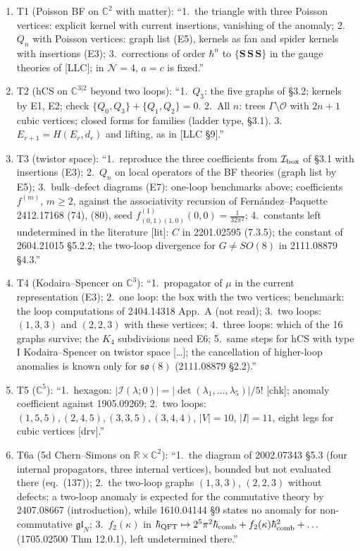 \documentclass[10pt,a4paper]{article}
\numberwithin{equation}{section}
\begin{document}
\begin{enumerate}\itemsep1pt
\item T1 (Poisson BF on $\mathbb C^2$ with matter): ``1.\ the triangle with three Poisson vertices: explicit kernel with current insertions, vanishing of the anomaly; 2.\ $Q_n$ with Poisson vertices: graph list (E5), kernels as fan and spider kernels with insertions (E3); 3.\ corrections of order $\hbar^n$ to $\{\mathbf S\,\mathbf S\,\mathbf S\}$ in the gauge theories of [LLC]; in $\mathcal N=4$, $a=c$ is fixed.''
\item T2 (hCS on $\mathbb C^{3|2}$ beyond two loops): ``1.\ $Q_3$: the five graphs of \S3.2; kernels by E1, E2; check $\{Q_0,Q_3\}+\{Q_1,Q_2\}=0$. 2.\ All $n$: trees $\Gamma\setminus\mathcal O$ with $2n+1$ cubic vertices; closed forms for families (ladder type, \S3.1). 3.\ $E_{r+1}=H(E_r,d_r)$ and lifting, as in [LLC \S9].''
\item T3 (twistor space): ``1.\ reproduce the three coefficients from $\mathcal I_{\rm box}$ of \S3.1 with insertions (E3); 2.\ $Q_n$ on local operators of the BF theories (graph list by E5); 3.\ bulk--defect diagrams (E7): one-loop benchmarks above; coefficients $f^{(m)}$, $m\ge2$, against the associativity recursion of Fern\'andez--Paquette 2412.17168 (74), (80), seed $f^{(1)}_{(0,1)(1,0)}(0,0)=\frac1{32\pi^2}$; 4.\ constants left undetermined in the literature [lit]: $C$ in 2201.02595 (7.3.5); the constant of 2604.21015 \S5.2.2; the two-loop divergence for $G\ne SO(8)$ in 2111.08879 \S4.3.''
\item T4 (Kodaira--Spencer on $\mathbb C^3$): ``1.\ propagator of $\mu$ in the current representation (E3); 2.\ one loop: the box with the two vertices; benchmark: the loop computations of 2404.14318 App.~A (not read); 3.\ two loops: $(1,3,3)$ and $(2,2,3)$ with these vertices; 4.\ three loops: which of the 16 graphs survive; the $K_4$ subdivisions need E6; 5.\ same steps for hCS with type I Kodaira--Spencer on twistor space [\dots]; the cancellation of higher-loop anomalies is known only for $\mathfrak{so}(8)$ (2111.08879 \S2.2).''
\item T5 ($\mathbb C^5$): ``1.\ hexagon: $|\mathcal I(\lambda;0)|=|\det(\lambda_1,\dots,\lambda_5)|/5!$ [chk]; anomaly coefficient against 1905.09269; 2.\ two loops: $(1,5,5),(2,4,5),(3,3,5),(3,4,4)$, $|V|=10$, $|I|=11$, eight legs for cubic vertices [drv].''
\item T6a (5d Chern--Simons on $\mathbb R\times\mathbb C^2$): ``1.\ the diagram of 2002.07343 \S5.3 (four internal propagators, three internal vertices), bounded but not evaluated there (eq.\ (137)); 2.\ the two-loop graphs $(1,3,3)$, $(2,2,3)$ without defects; a two-loop anomaly is expected for the commutative theory by 2407.08667 (introduction), while 1610.04144 \S9 states no anomaly for non-commutative $\mathfrak{gl}_N$; 3.\ $f_2(\kappa)$ in $\hbar_{\rm QFT}\mapsto2^5\pi^2\hbar_{\rm comb}+f_2(\kappa)\hbar_{\rm comb}^2+\dots$ (1705.02500 Thm 12.0.1), left undetermined there.''

\end{enumerate}
\end{document}
